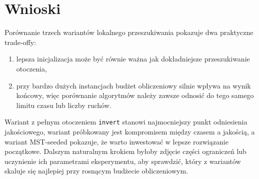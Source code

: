 \documentclass[12pt,a4paper]{article}
\begin{document}
\section{Wnioski}
Porównanie trzech wariantów lokalnego przeszukiwania pokazuje dwa praktyczne trade-offy:
\begin{enumerate}
    \item lepsza inicjalizacja może być równie ważna jak dokładniejsze przeszukiwanie otoczenia,
    \item przy bardzo dużych instancjach budżet obliczeniowy silnie wpływa na wynik końcowy,
    więc porównanie algorytmów należy zawsze odnosić do tego samego limitu czasu lub liczby ruchów.
\end{enumerate}

Wariant z pełnym otoczeniem \texttt{invert} stanowi najmocniejszy punkt odniesienia jakościowego,
wariant próbkowany jest kompromisem między czasem a jakością, a wariant MST-seeded pokazuje, że
warto inwestować w lepsze rozwiązanie początkowe. Dalszym naturalnym krokiem byłoby zdjęcie części
ograniczeń lub uczynienie ich parametrami eksperymentu, aby sprawdzić, który z wariantów skaluje się
najlepiej przy rosnącym budżecie obliczeniowym.
\end{document}
